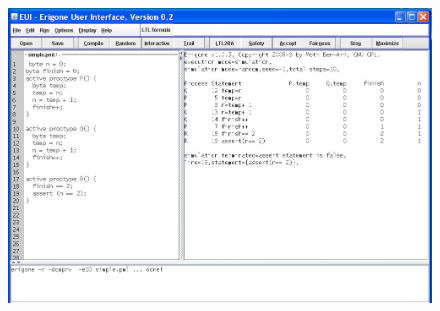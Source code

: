\documentclass[11pt]{article}
\begin{document}
\begin{figure}[tb]
\begin{center}
\includegraphics[width=140mm]{eui.png}
\end{center}
\end{figure}
\end{document}
